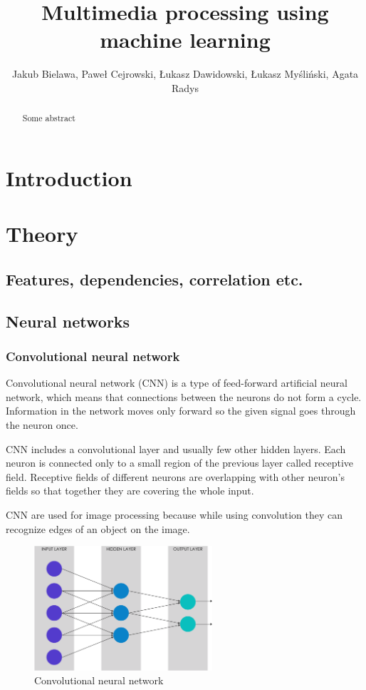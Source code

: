 \documentclass[journal, a4paper]{IEEEtran}
\begin{document}
	\title{Multimedia processing using machine learning}
	\author{Jakub Bielawa, Paweł Cejrowski, Łukasz Dawidowski, Łukasz Myśliński, Agata Radys}
	\maketitle

\begin{abstract}
Some abstract
\end{abstract}

\section{Introduction}
\section{Theory}
\subsection{Features, dependencies, correlation etc.}
\subsection{Neural networks}

\subsubsection{Convolutional neural network}
Convolutional neural network (CNN) is a type of feed-forward artificial neural network, which means that connections between the neurons do not form a cycle. Information in the network moves only forward so the given signal goes through the neuron once.
\par CNN includes a convolutional layer and usually few other hidden layers. Each neuron is connected only to a small region of the previous layer called receptive field. Receptive fields of different neurons are overlapping with other neuron's fields so that together they are covering the whole input.
\par CNN are used for image processing because while using convolution they can recognize edges of an object on the image.
\begin{figure}[H]
\centering
\includegraphics[width=250px]{pictures/cnn.png}
\caption{Convolutional neural network}
\end{figure}
\end{document}

